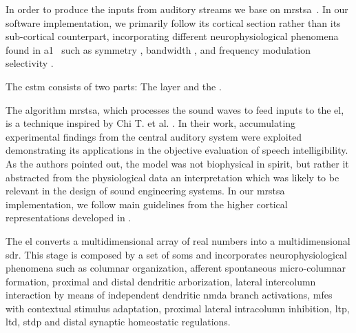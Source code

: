 {In order to produce the inputs from auditory streams we base on \gls{mrstsa}~\cite{chi_2005}. In our software implementation, we primarily follow its cortical section rather than its sub-cortical counterpart, incorporating different neurophysiological phenomena found in \gls{a1}~\cite{wang_1995} such as symmetry \cite{shamma_1993}, bandwidth \cite{schreiner_1990}, and frequency modulation selectivity \cite{shamma_1993,heil_1992,mendelson_1985}.


The \gls{cstm} consists of two parts: The  layer and the .

The algorithm \gls{mrstsa}, which processes the sound waves to feed inputs to the \gls{el}, is a technique inspired by Chi T. et al. \cite{chi_2005}. In their work, accumulating experimental findings from the central auditory system were exploited demonstrating its applications in the objective evaluation of speech intelligibility. As the authors pointed out, the model was not biophysical in spirit, but rather it abstracted from the physiological data an interpretation which was likely to be relevant in the design of sound engineering systems. In our \gls{mrstsa} implementation, we follow main guidelines from the higher cortical representations developed in \cite{chi_2005}.

The \gls{el} converts a multidimensional array of real numbers into a multidimensional \gls{sdr}. This stage is composed by a set of \glspl{som} \cite{kohonen_2082, Kohonen:1989:SAM:69371} and incorporates neurophysiological phenomena such as columnar organization, afferent spontaneous micro-columnar formation, proximal and distal dendritic arborization, lateral intercolumn interaction by means of independent dendritic \gls{nmda} branch activations, \glspl{mfe} with contextual stimulus adaptation, proximal lateral intracolumn inhibition, \gls{ltp}, \gls{ltd}, \gls{stdp} and distal synaptic homeostatic regulations.
}




























































